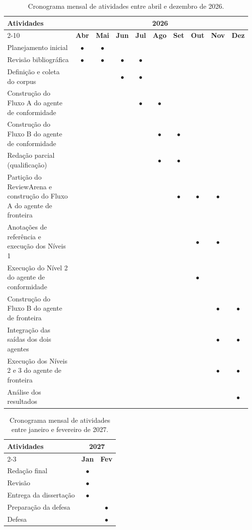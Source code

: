 \begin{table}[H]
\centering
\caption{Cronograma mensal de atividades entre abril e dezembro de 2026.}
\label{tab:cronograma-2026}
\small
\begin{tabular}{|p{6.2cm}|c|c|c|c|c|c|c|c|c|}
\hline
\textbf{Atividades} & \multicolumn{9}{c|}{\textbf{2026}} \\
\cline{2-10}
 & \textbf{Abr} & \textbf{Mai} & \textbf{Jun} & \textbf{Jul} & \textbf{Ago} & \textbf{Set} & \textbf{Out} & \textbf{Nov} & \textbf{Dez} \\
\hline
Planejamento inicial & $\bullet$ & $\bullet$ & & & & & & & \\
\hline
Revisão bibliográfica & $\bullet$ & $\bullet$ & $\bullet$ & $\bullet$ & & & & & \\
\hline
Definição e coleta do corpus & & & $\bullet$ & $\bullet$ & & & & & \\
\hline
Construção do Fluxo A do agente de conformidade & & & & $\bullet$ & $\bullet$ & & & & \\
\hline
Construção do Fluxo B do agente de conformidade & & & & & $\bullet$ & $\bullet$ & & & \\
\hline
Redação parcial (qualificação) & & & & & $\bullet$ & $\bullet$ & & & \\
\hline
Partição do ReviewArena e construção do Fluxo A do agente de fronteira & & & & & & $\bullet$ & $\bullet$ & $\bullet$ & \\
\hline
Anotações de referência e execução dos Níveis 1 & & & & & & & $\bullet$ & $\bullet$ & \\
\hline
Execução do Nível 2 do agente de conformidade & & & & & & & $\bullet$ & & \\
\hline
Construção do Fluxo B do agente de fronteira & & & & & & & & $\bullet$ & $\bullet$ \\
\hline
Integração das saídas dos dois agentes & & & & & & & & $\bullet$  & $\bullet$ \\
\hline
Execução dos Níveis 2 e 3 do agente de fronteira & & & & & & & & $\bullet$ & $\bullet$ \\
\hline
Análise dos resultados & & & & & & & & & $\bullet$ \\
\hline
\end{tabular}
\end{table}

\begin{table}[H]
\centering
\caption{Cronograma mensal de atividades entre janeiro e fevereiro de 2027.}
\label{tab:cronograma-2027}
\small
\begin{tabular}{|p{9.0cm}|c|c|}
\hline
\textbf{Atividades} & \multicolumn{2}{c|}{\textbf{2027}} \\
\cline{2-3}
 & \textbf{Jan} & \textbf{Fev} \\
\hline
Redação final & $\bullet$ & \\
\hline
Revisão & $\bullet$ & \\
\hline
Entrega da dissertação & $\bullet$ & \\
\hline
Preparação da defesa & & $\bullet$ \\
\hline
Defesa & & $\bullet$ \\
\hline
\end{tabular}
\end{table}

